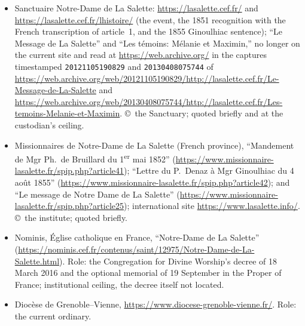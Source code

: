 \begin{itemize}
\item Sanctuaire Notre-Dame de La Salette: \url{https://lasalette.cef.fr/}
and \url{https://lasalette.cef.fr/lhistoire/} (the event, the 1851
recognition with the French transcription of article~1, and the 1855
Ginoulhiac sentence); ``Le Message de La Salette'' and ``Les
témoins: Mélanie et Maximin,'' no longer on the current site and
read at \url{https://web.archive.org/} in the captures timestamped
\texttt{20121105190829} and \texttt{20130408075744} of
\url{https://web.archive.org/web/20121105190829/http://lasalette.cef.fr/Le-Message-de-La-Salette}
and
\url{https://web.archive.org/web/20130408075744/http://lasalette.cef.fr/Les-temoins-Melanie-et-Maximin}.
\copyright\ the Sanctuary; quoted briefly and at the custodian's
ceiling.
\item Missionnaires de Notre-Dame de La Salette (French province),
``Mandement de Mgr Ph.~de Bruillard du
1\textsuperscript{er} mai 1852''
(\url{https://www.missionnaire-lasalette.fr/spip.php?article41});
``Lettre du P.~Denaz à Mgr Ginoulhiac du 4 août 1855''
(\url{https://www.missionnaire-lasalette.fr/spip.php?article42});
and ``Le message de Notre Dame de La Salette''
(\url{https://www.missionnaire-lasalette.fr/spip.php?article25});
international site \url{https://www.lasalette.info/}. \copyright\ the
institute; quoted briefly.
\item Nominis, Église catholique en France, ``Notre-Dame de La
Salette''
(\url{https://nominis.cef.fr/contenus/saint/12975/Notre-Dame-de-La-Salette.html}).
Role: the Congregation for Divine Worship's decree of 18 March 2016
and the optional memorial of 19 September in the Proper of France;
institutional ceiling, the decree itself not located.
\item Diocèse de Grenoble--Vienne, \url{https://www.diocese-grenoble-vienne.fr/}.
Role: the current ordinary.
\end{itemize}

